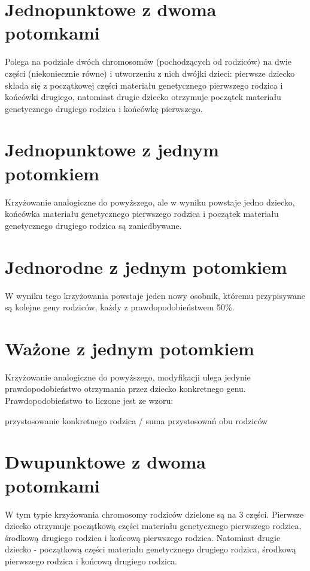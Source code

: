 \documentclass[11pt]{aghdpl}
\begin{document}
\section{Jednopunktowe z dwoma potomkami}
\label{sec:jedenDwa}
Polega na podziale dwóch chromosomów (pochodzących od rodziców) na dwie części (niekoniecznie równe) i utworzeniu z nich 
dwójki dzieci: pierwsze dziecko składa się z początkowej części materiału genetycznego pierwszego rodzica i końcówki drugiego, 
natomiast drugie dziecko otrzymuje początek materiału genetycznego drugiego rodzica i końcówkę pierwszego.

\section{Jednopunktowe z jednym potomkiem}
\label{sec:jedenJeden}
Krzyżowanie analogiczne do powyższego, ale w wyniku powstaje jedno dziecko, końcówka materiału genetycznego pierwszego 
rodzica i początek materiału genetycznego drugiego rodzica są zaniedbywane.

\section{Jednorodne z jednym potomkiem}
\label{sec:uniform}
W wyniku tego krzyżowania powstaje jeden nowy osobnik, któremu przypisywane są kolejne geny rodziców, każdy z prawdopodobieństwem 50\%.

\section{Ważone z jednym potomkiem}
\label{sec:wazone}
Krzyżowanie analogiczne do powyższego, modyfikacji ulega jedynie prawdopodobieństwo otrzymania przez dziecko konkretnego genu. 
Prawdopodobieństwo to liczone jest ze wzoru:
\begin{center}
przystosowanie konkretnego rodzica / suma przystosowań obu rodziców
\end{center}

\section{Dwupunktowe z dwoma potomkami}
\label{sec:dwaDwa}
W tym typie krzyżowania chromosomy rodziców dzielone są na 3 części. Pierwsze dziecko otrzymuje początkową części materiału 
genetycznego pierwszego rodzica, środkową drugiego rodzica i końcową pierwszego rodzica. Natomiast drugie dziecko - 
początkową części materiału genetycznego drugiego rodzica, środkową pierwszego rodzica i końcową drugiego rodzica.
\end{document}
